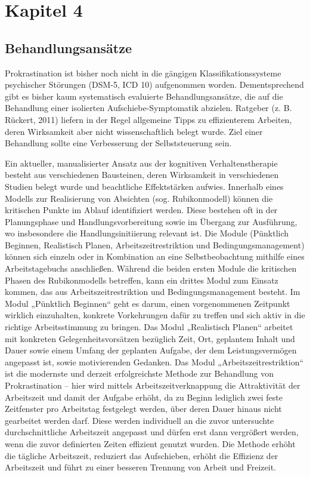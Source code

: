 \chapter{Kapitel 4}
\label{cha:kapitel-4}

\section{Behandlungsansätze}
\label{sec:behandlungsansätze}
Prokrastination ist bisher noch nicht in die gängigen Klassifikationssysteme psychischer Störungen (DSM-5, ICD 10) aufgenommen worden. Dementsprechend gibt es bisher kaum systematisch evaluierte Behandlungsansätze, die auf die Behandlung einer isolierten Aufschiebe-Symptomatik abzielen. Ratgeber (z. B. Rückert, 2011\cite{wiki}) liefern in der Regel allgemeine Tipps zu effizienterem Arbeiten, deren Wirksamkeit aber nicht wissenschaftlich belegt wurde. Ziel einer Behandlung sollte eine Verbesserung der Selbststeuerung sein.

Ein aktueller, manualisierter Ansatz\cite{hoecker:2013} aus der kognitiven Verhaltenstherapie besteht aus verschiedenen Bausteinen, deren Wirksamkeit in verschiedenen Studien\cite{wiki} belegt wurde und beachtliche Effektstärken aufwies. Innerhalb eines Modells zur Realisierung von Absichten (sog. Rubikonmodell) können die kritischen Punkte im Ablauf identifiziert werden. Diese bestehen oft in der Planungsphase und Handlungsvorbereitung sowie im Übergang zur Ausführung, wo insbesondere die Handlungsinitiierung relevant ist. Die Module (Pünktlich Beginnen, Realistisch Planen, Arbeitszeitrestriktion und Bedingungsmanagement) können sich einzeln oder in Kombination an eine Selbstbeobachtung mithilfe eines Arbeitstagebuchs anschließen. Während die beiden ersten Module die kritischen Phasen des Rubikonmodells betreffen, kann ein drittes Modul zum Einsatz kommen, das aus Arbeitszeitrestriktion und Bedingungsmanagement besteht. Im Modul „Pünktlich Beginnen“ geht es darum, einen vorgenommenen Zeitpunkt wirklich einzuhalten, konkrete Vorkehrungen dafür zu treffen und sich aktiv in die richtige Arbeitsstimmung zu bringen. Das Modul „Realistisch Planen“ arbeitet mit konkreten Gelegenheitsvorsätzen bezüglich Zeit, Ort, geplantem Inhalt und Dauer sowie einem Umfang der geplanten Aufgabe, der dem Leistungsvermögen angepasst ist, sowie motivierenden Gedanken. Das Modul „Arbeitszeitrestriktion“ ist die modernste und derzeit erfolgreichste Methode zur Behandlung von Prokrastination – hier wird mittels Arbeitszeitverknappung die Attraktivität der Arbeitszeit und damit der Aufgabe erhöht, da zu Beginn lediglich zwei feste Zeitfenster pro Arbeitstag festgelegt werden, über deren Dauer hinaus nicht gearbeitet werden darf. Diese werden individuell an die zuvor untersuchte durchschnittliche Arbeitszeit angepasst und dürfen erst dann vergrößert werden, wenn die zuvor definierten Zeiten effizient genutzt wurden. Die Methode erhöht die tägliche Arbeitszeit, reduziert das Aufschieben, erhöht die Effizienz der Arbeitszeit und führt zu einer besseren Trennung von Arbeit und Freizeit.